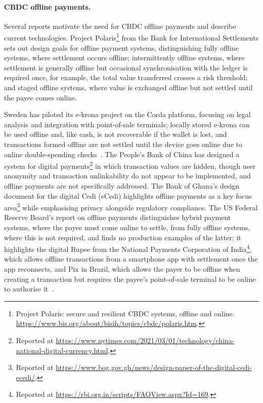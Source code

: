 \paragraph{CBDC offline payments.} Several reports motivate the need for CBDC
offline payments and describe current technologies. Project
Polaris\footnote{Project Polaris: secure and resilient CBDC systems, offline
and online.
\url{https://www.bis.org/about/bisih/topics/cbdc/polaris.htm}.} from the Bank
for International Settlements sets out design goals for offline payment
systems, distinguishing fully offline systems, where settlement occurs
offline; intermittently offline systems, where settlement is generally
offline but occasional synchronisation with the ledger is required once, for
example, the total value transferred crosses a risk threshold; and staged
offline systems, where value is exchanged offline but not settled until the
payee comes online.

Sweden has piloted its e-krona project on the Corda
platform, focusing on legal analysis
and integration with point-of-sale terminals; locally stored e-krona can be
used offline and, like cash, is not recoverable if the wallet is lost, and
transactions formed offline are not settled until the device goes online due
to online double-spending checks~\cite{brown2016corda,soderberg2019krona}. The People's Bank of China has designed a
system for digital payments\footnote{Reported at
\url{https://www.nytimes.com/2021/03/01/technology/china-national-digital-currency.html}.}
in which transaction values are hidden, though user anonymity and
transaction unlinkability do not appear to be implemented, and offline
payments are not specifically addressed. The Bank of Ghana's design document
for the digital Cedi (eCedi) highlights offline payments as a key focus
area\footnote{Reported at \url{https://www.bog.gov.gh/news/design-paper-of-the-digital-cedi-ecedi/}.}
while emphasising privacy alongside regulatory compliance. The US Federal
Reserve Board's report on offline payments
distinguishes hybrid payment systems, where the payee must come online to
settle, from fully offline systems, where this is not required, and finds no
production examples of the latter; it highlights the digital Rupee from the
National Payments Corporation of
India\footnote{Reported at \url{https://rbi.org.in/scripts/FAQView.aspx?Id=169}.}, which
allows offline transactions from a smartphone app with settlement once the
app reconnects, and Pix in Brazil, which allows the payer to be offline when
creating a transaction but requires the payee's point-of-sale terminal to be
online to authorise it~\cite{aboulaiz2024offline,lobo2021pix}.

